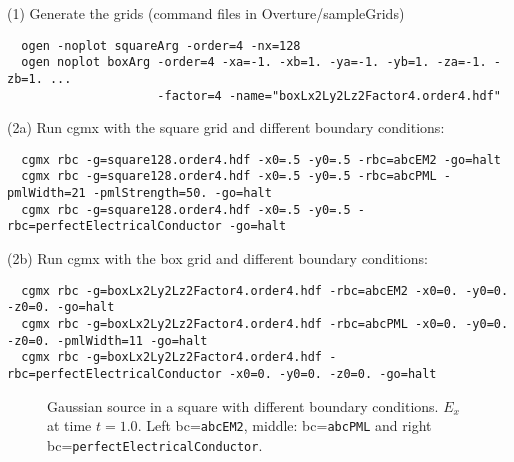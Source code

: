 \noindent (1) Generate the grids (command files in Overture/sampleGrids)
{\small
\begin{verbatim}
  ogen -noplot squareArg -order=4 -nx=128
  ogen noplot boxArg -order=4 -xa=-1. -xb=1. -ya=-1. -yb=1. -za=-1. -zb=1. ...
                     -factor=4 -name="boxLx2Ly2Lz2Factor4.order4.hdf"
\end{verbatim}
}
\noindent (2a) Run cgmx with the square grid and different boundary conditions: 
{\small
\begin{verbatim}
  cgmx rbc -g=square128.order4.hdf -x0=.5 -y0=.5 -rbc=abcEM2 -go=halt
  cgmx rbc -g=square128.order4.hdf -x0=.5 -y0=.5 -rbc=abcPML -pmlWidth=21 -pmlStrength=50. -go=halt
  cgmx rbc -g=square128.order4.hdf -x0=.5 -y0=.5 -rbc=perfectElectricalConductor -go=halt  
\end{verbatim}
}
\noindent (2b) Run cgmx with the box grid and different boundary conditions: 
{\small
\begin{verbatim}
  cgmx rbc -g=boxLx2Ly2Lz2Factor4.order4.hdf -rbc=abcEM2 -x0=0. -y0=0. -z0=0. -go=halt
  cgmx rbc -g=boxLx2Ly2Lz2Factor4.order4.hdf -rbc=abcPML -x0=0. -y0=0. -z0=0. -pmlWidth=11 -go=halt
  cgmx rbc -g=boxLx2Ly2Lz2Factor4.order4.hdf -rbc=perfectElectricalConductor -x0=0. -y0=0. -z0=0. -go=halt
\end{verbatim}
}
{
\begin{figure}[hbt]
\newcommand{\figWidth}{5.5cm}
\newcommand{\trimfig}[2]{\trimFig{#1}{#2}{0.1}{0.05}{.05}{.05}}
\begin{center}
\end{center}
\caption{Gaussian source in a square with different boundary conditions. $E_x$ at time $t=1.0$. Left bc={\tt abcEM2}, middle: bc={\tt abcPML} and
right bc={\tt perfectElectricalConductor}. }
\label{fig:rbcSquare}
\end{figure}
}
